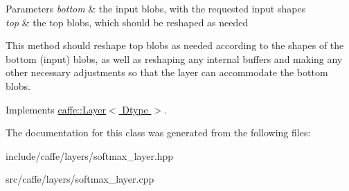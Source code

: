 \begin{DoxyParams}{Parameters}
{\em bottom} & the input blobs, with the requested input shapes \\
\hline
{\em top} & the top blobs, which should be reshaped as needed\\
\hline
\end{DoxyParams}
This method should reshape top blobs as needed according to the shapes of the bottom (input) blobs, as well as reshaping any internal buffers and making any other necessary adjustments so that the layer can accommodate the bottom blobs. 

Implements \hyperlink{classcaffe_1_1Layer_ad9d391b972c769c0ebee34ca6d1c973e}{caffe\+::\+Layer$<$ Dtype $>$}.



The documentation for this class was generated from the following files\+:\begin{DoxyCompactItemize}
\item 
include/caffe/layers/softmax\+\_\+layer.\+hpp\item 
src/caffe/layers/softmax\+\_\+layer.\+cpp\end{DoxyCompactItemize}
